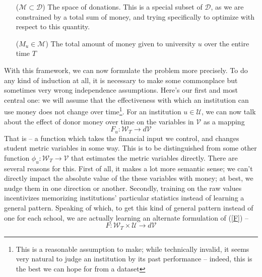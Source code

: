 \documentclass[paper.tex]{subfiles}
\newcommand{\U}{\mathcal{U}}
\newcommand{\D}{\mathcal{D}}
\newcommand{\V}{\mathcal{V}}
\newcommand{\W}{\mathcal{W}}
\begin{document}
	\begin{itemize}[leftmargin=5em]
		\item[($\mathcal{M} \subset \D$)] The space of donations. This is a special subset of $\D$, as we are constrained by a total sum of money, and trying specifically to optimize with respect to this quantity.
		\item[($M_u \in \mathcal{M}$)] The total amount of money given to university $u$ over the entire time $T$
	\end{itemize}
	
	With this framework, we can now formulate the problem more precisely. To do any kind of induction at all, it is necessary to make some commonplace but sometimes very wrong independence assumptions. Here's our first and most central one: we will assume that the effectiveness with which an institution can use money does not change over time\footnote{This is a reasonable assumption to make; while technically invalid, it seems very natural to judge an institution by its past performance -- indeed, this is the best we can hope for from a dataset}. For an institution $u \in \U$, we can now talk about the effect of donor money over time on the variables in $\V$ as a mapping
	\begin{equation}
		F_u: \W_T \to d\V \label{F}
	\end{equation} 	
	That is -- a function which takes the financial input we control, and changes student metric variables in some way. This is to be distinguished from some other function $\phi_u: \W_T \to \V$ that estimates the metric variables directly. There are several reasons for this. First of all, it makes a lot more semantic sense; we can't directly impact the absolute value of the these variables with money; at best, we nudge them in one direction or another. Secondly, training on the raw values incentivizes memorizing institutions' particular statistics instead of learning a general pattern. Speaking of which, to get this kind of general pattern instead of one for each school, we are actually learning an alternate formulation of (\ref{F}) -- 
	\[F: \W_T \times \U \to d\V \]
	
\end{document}
